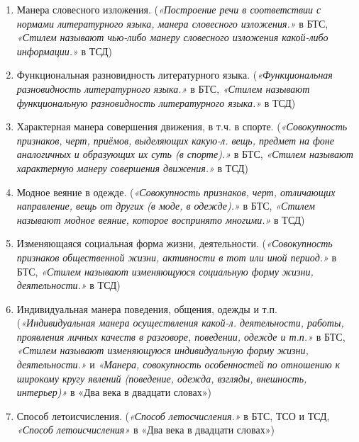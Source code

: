 \begin{enumerate}
    \item Манера словесного изложения.
(\textit{«Построение речи в соответствии с нормами литературного языка, манера словесного изложения.»} в БТС,
\textit{«Стилем называют чью-либо манеру словесного изложения какой-либо информации.»} в ТСД)

    \item Функциональная разновидность литературного языка.
(\textit{«Функциональная разновидность литературного языка.»} в БТС,
\textit{«Стилем называют функциональную разновидность литературного языка.»} в ТСД)

    \item Характерная манера совершения движения, в т.ч. в спорте.
(\textit{«Совокупность признаков, черт, приёмов, выделяющих какую-л. вещь, предмет на фоне аналогичных и образующих их суть (в спорте).»} в БТС,
\textit{«Стилем называют характерную манеру совершения движения.»} в ТСД)

    \item Модное веяние в одежде.
(\textit{«Совокупность признаков, черт, отличающих направление, вещь от других (в моде, в одежде).»} в БТС,
\textit{«Стилем называют модное веяние, которое воспринято многими.»} в ТСД)

    \item Изменяющаяся социальная форма жизни, деятельности.
(\textit{«Совокупность признаков общественной жизни, активности в тот или иной период.»} в БТС,
\textit{«Стилем называют изменяющуюся социальную форму жизни, деятельности.»} в ТСД)

    \item Индивидуальная манера поведения, общения, одежды и т.п.
(\textit{«Индивидуальная манера осуществления какой-л. деятельности, работы, проявления личных качеств в разговоре, поведении, одежде и т.п.»} в БТС,
\textit{«Стилем называют изменяющуюся индивидуальную форму жизни, деятельности.»} и \textit{«Манера, совокупность особенностей по отношению к широкому кругу явлений (поведение, одежда, взгляды, внешность, интерьер)»} в «Два века в двадцати словах»)

    \item Способ летоисчисления.
(\textit{«Способ летосчисления.»} в БТС, ТСО и ТСД,
\textit{«Способ летоисчисления»} в «Два века в двадцати словах»)


\end{enumerate}

